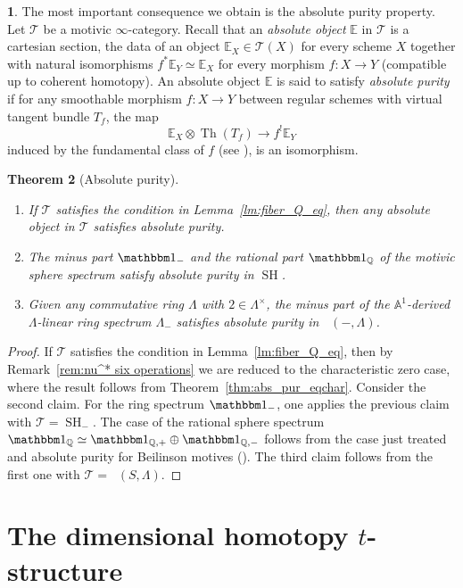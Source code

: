 \documentclass[JEP,XML,SOM,Unicode]{cedram}
\newcommand{\tstructure}{$t$-structure\xspace}
\newcommand{\T}{\mathscr T}
\renewcommand{\AA}{\mathbb A}
\newcommand{\E}{\mathbb E}
\newcommand{\un}{\mathbbm 1}
\DeclareMathOperator{\SH}{SH}
\DeclareMathOperator{\DA}{D_{\AA^1}}
\DeclareMathOperator{\Th}{Th}
\newcommand{\QQ} {\mathbb Q}
\newtheorem{thm}{Theorem}[section]
\theoremstyle{remark}
\theoremstyle{definition}
\newtheorem{num}[thm]{}
\numberwithin{equation}{thm}
\begin{document}
\begin{num}
\label{num:abs_pur_def}
The most important consequence we obtain is the absolute purity property. Let $\T$ be a motivic $\infty$-category. Recall that an \emph{absolute object} $\E$ in $\T$ is a cartesian section, \ie the data of an object $\E_X\in\T(X)$ for every scheme $X$ together with natural isomorphisms $f^*\E_Y\simeq \E_X$ for every morphism $f:X\to Y$ (compatible up to coherent homotopy). An absolute object $\E$ is said to satisfy \emph{absolute purity} if for any smoothable morphism $f : X \to Y$ between regular schemes with virtual tangent bundle $T_f$, the map
\[
\E_X\otimes\Th(T_f)\to f^!\E_Y
\]
induced by the fundamental class of $f$ (see \cite[Def.\,4.3.7]{DJK}), is an isomorphism.
\end{num}
\skpt
\begin{thm}[Absolute purity]
\label{thm:absolute_purity}
\begin{enumerate}
\item If $\T$ satisfies the condition in Lemma~\ref{lm:fiber_Q_eq}, then any absolute object in $\T$ satisfies absolute purity.
\item The minus part $\un_-$ and the rational part $\un_\QQ$ of the motivic sphere spectrum
satisfy absolute purity in $\SH$.
\item Given any commutative ring $\Lambda$ with $2 \in \Lambda^\times$,
the minus part of the $\AA^1$-derived $\Lambda$-linear ring spectrum $\Lambda_{-}$
satisfies absolute purity in $\DA(-,\Lambda)$.
\end{enumerate}
\end{thm}
\begin{proof}
If $\T$ satisfies the condition in Lemma~\ref{lm:fiber_Q_eq}, then by Remark~\ref{rem:nu^* six operations} we are redu\-ced to the characteristic zero case, where the result follows from Theorem~\ref{thm:abs_pur_eqchar}.
Consider the second claim. For the ring spectrum $\un_-$, one applies the previous claim with $\T=\SH_-$.
The case of the rational sphere spectrum $\un_\QQ \simeq \un_{\QQ,+}\oplus\un_{\QQ,-}$ follows from the case just treated and absolute purity for Beilinson motives (\cite[Th.\,14.4.1]{CD3}).
The third claim follows from the first one with $\T=\DA(S,\Lambda)$.
\end{proof}

\section{The dimensional homotopy \texorpdfstring{\tstructure}{tstructure}}
\label{sec:t-structure}
\end{document}
